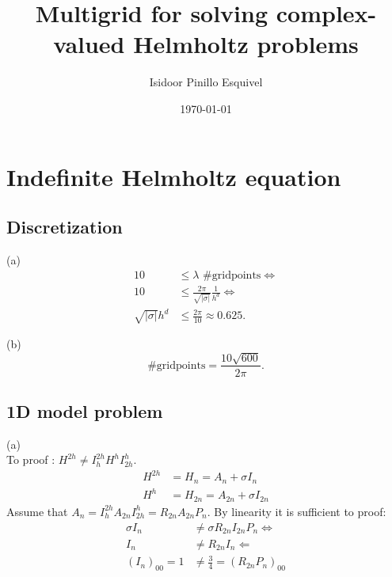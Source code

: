 \documentclass[a4paper,12pt]{article}
\begin{document}
\title{Multigrid for solving complex-valued Helmholtz problems}
\author{Isidoor Pinillo Esquivel}
\date{\today}
\maketitle

\section{Indefinite Helmholtz equation}

\subsection{Discretization}
(a)
\begin{align}
    10                    & \leq \lambda \text{ \#gridpoints} \Leftrightarrow                \\
    10                    & \leq \frac{2\pi}{\sqrt{|\sigma|}} \frac{1}{h^{d}}\Leftrightarrow \\
    \sqrt{|\sigma|} h^{d} & \leq \frac{2 \pi}{10} \approx 0.625.
\end{align}

(b)
\[
    \text{\# gridpoints} = \frac{10 \sqrt{600}}{2 \pi}
    .\]

\subsection{1D model problem}
(a) \\
To proof : $H^{2 h} \neq I_h^{2 h} H^h I_{2 h}^h$.
\begin{align}
    H^{2h} & = H_n = A_n +\sigma {I}_n          \\
    H^{h}  & = H_{2n} = A_{2n} +\sigma {I}_{2n}
\end{align}
Assume that $A_n =I_h^{2 h} A_{2n} I_{2 h}^h= R_{2n} A_{2n} P_n$. By linearity it is  sufficient
to proof:
\begin{align}
    \sigma {I}_n  & \neq \sigma R_{2n} {I}_{2n} P_{n} \Leftrightarrow \\
    {I}_n         & \neq R_{2n} I_{n} \Leftarrow                      \\
    (I_n)_{00} =1 & \neq \frac{3}{4} = (R_{2n} P_{n})_{00}
\end{align}
\end{document}
